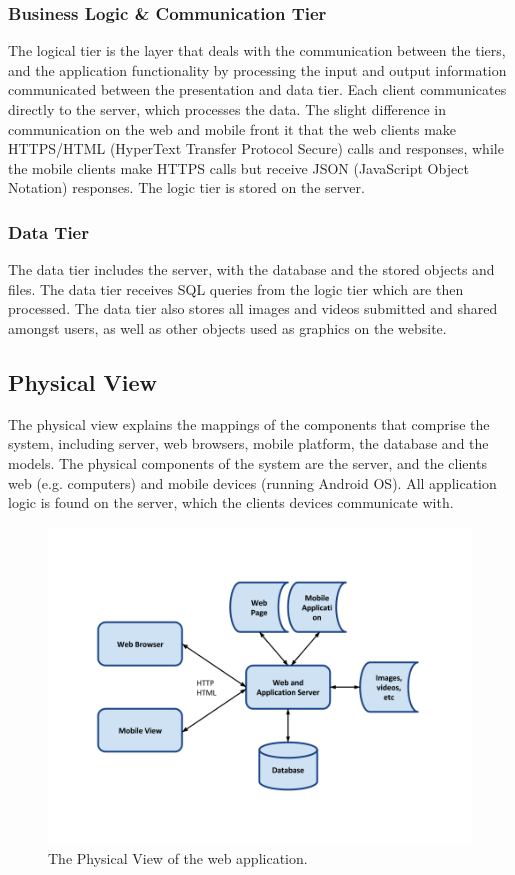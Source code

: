 \subsubsection{Business Logic \& Communication Tier}
The logical tier is the layer that deals with the communication between the tiers, and the application functionality by processing the input and output information communicated between the presentation and data tier. Each client communicates directly to the server, which processes the data. The slight difference in communication on the web and mobile front it that the web clients make HTTPS/HTML (HyperText Transfer Protocol Secure) calls and responses, while the mobile clients make HTTPS calls but receive JSON (JavaScript Object Notation) responses. The logic tier is stored on the server. 

\subsubsection{Data Tier}
The data tier includes the server, with the database and the stored objects and files. The data tier receives SQL queries from the logic tier which are then processed. The data tier also stores all images and videos submitted and shared amongst users, as well as other objects used as graphics on the website. 

\subsection{Physical View}
\label{subsec:ArchViewsPhysical}
The physical view explains the mappings of the components that comprise the system, including server, web browsers, mobile platform, the database and the models. The physical components of the system are the server, and the clients web (e.g. computers) and mobile devices (running Android OS). All application logic is found on the server, which the clients devices communicate with.

\begin{landscape}
\begin{figure}[htbp]
\centering
\includegraphics[width=0.8\linewidth]{./Architecture/img/PhysicalView.png}
\caption{The Physical View of the web application. \label{fig:ArhViewsPhysical}}
\end{figure}
\end{landscape}

